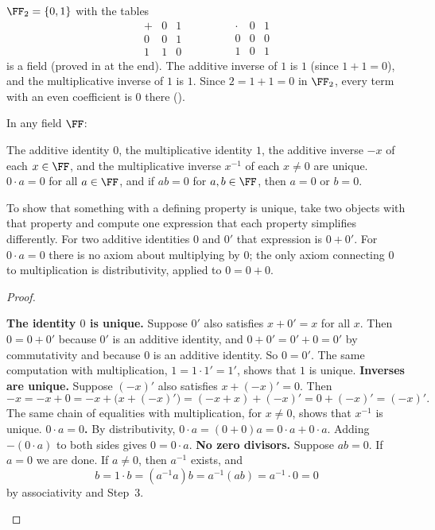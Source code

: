 \documentclass[10pt]{scrartcl}
\begin{document}
\begin{example*}
  $\FF_2=\{0,1\}$ with the tables
  \[
    \begin{array}{c|cc} + & 0 & 1\\\hline 0&0&1\\ 1&1&0\end{array}
    \qquad\qquad
    \begin{array}{c|cc} \cdot & 0 & 1\\\hline 0&0&0\\ 1&0&1\end{array}
  \]
  is a field (proved in  at the end). The additive inverse of $1$ is $1$ (since $1+1=0$), and the multiplicative inverse of $1$ is $1$. Since $2=1+1=0$ in $\FF_2$, every term with an even coefficient is $0$ there ().
\end{example*}

\begin{proposition*}
  In any field $\FF$:
  \begin{enumerate}[(a)]
    \ii The additive identity $0$, the multiplicative identity $1$, the additive inverse $-x$ of each $x\in\FF$, and the multiplicative inverse $x^{-1}$ of each $x\ne 0$ are unique.
    \ii $0\cdot a = 0$ for all $a\in\FF$, and if $ab=0$ for $a,b\in\FF$, then $a=0$ or $b=0$.
  \end{enumerate}
\end{proposition*}
\begin{ideabox}
  To show that something with a defining property is unique, take two objects with that property and compute one expression that each property simplifies differently. For two additive identities $0$ and $0'$ that expression is $0+0'$. For $0\cdot a=0$ there is no axiom about multiplying by $0$; the only axiom connecting $0$ to multiplication is distributivity, applied to $0=0+0$.
\end{ideabox}
\begin{proof}
  \begin{steps}
    \ii \textbf{The identity $0$ is unique.} Suppose $0'$ also satisfies $x+0'=x$ for all $x$. Then $0=0+0'$ because $0'$ is an additive identity, and $0+0'=0'+0=0'$ by commutativity and because $0$ is an additive identity. So $0=0'$. The same computation with multiplication, $1=1\cdot1'=1'$, shows that $1$ is unique.
    \ii \textbf{Inverses are unique.} Suppose $(-x)'$ also satisfies $x+(-x)'=0$. Then
    \[
      -x=-x+0=-x+\bigl(x+(-x)'\bigr)=(-x+x)+(-x)'=0+(-x)'=(-x)'.
    \]
    The same chain of equalities with multiplication, for $x\ne 0$, shows that $x^{-1}$ is unique.
    \ii \textbf{$0\cdot a=0$.} By distributivity, $0\cdot a=(0+0)a=0\cdot a+0\cdot a$. Adding $-(0\cdot a)$ to both sides gives $0=0\cdot a$.
    \ii \textbf{No zero divisors.} Suppose $ab=0$. If $a=0$ we are done. If $a\ne 0$, then $a^{-1}$ exists, and
    \[
      b=1\cdot b=(a^{-1}a)b=a^{-1}(ab)=a^{-1}\cdot 0=0
    \]
    by associativity and Step~3.
  \end{steps}
\end{proof}
\end{document}
